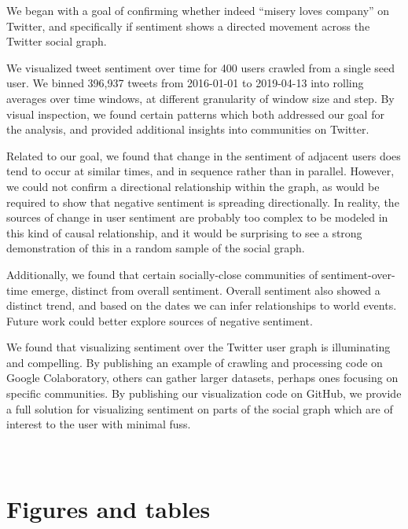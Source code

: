 \documentclass[11pt]{article}
\begin{document}
We began with a goal of confirming whether indeed “misery loves company” on Twitter, and specifically if sentiment shows a directed movement across the Twitter social graph.\newline

We visualized tweet sentiment over time for 400 users crawled from a single seed user. We binned 396,937 tweets from 2016-01-01 to 2019-04-13 into rolling averages over time windows, at different granularity of window size and step. By visual inspection, we found certain patterns which both addressed our goal for the analysis, and provided additional insights into communities on Twitter.\newline

Related to our goal, we found that change in the sentiment of adjacent users does tend to occur at similar times, and in sequence rather than in parallel. However, we could not confirm a directional relationship within the graph, as would be required to show that negative sentiment is spreading directionally. In reality, the sources of change in user sentiment are probably too complex to be modeled in this kind of causal relationship, and it would be surprising to see a strong demonstration of this in a random sample of the social graph.\newline

Additionally, we found that certain socially-close communities of sentiment-over-time emerge, distinct from overall sentiment. Overall sentiment also showed a distinct trend, and based on the dates we can infer relationships to world events. Future work could better explore sources of negative sentiment.\newline

We found that visualizing sentiment over the Twitter user graph is illuminating and compelling. By publishing an example of crawling and processing code on Google Colaboratory, others can gather larger datasets, perhaps ones focusing on specific communities. By publishing our visualization code on GitHub, we provide a full solution for visualizing sentiment on parts of the social graph which are of interest to the user with minimal fuss.

\appendix
\section{\\Figures and tables}
\end{document}
